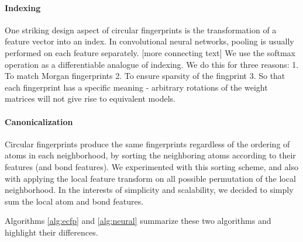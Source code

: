 \documentclass{article}
\begin{document}
\paragraph{Indexing}
One striking design aspect of circular fingerprints is the transformation of a feature vector into an index.
In convolutional neural networks, pooling is usually performed on each feature separately.
[more connecting text]
We use the softmax operation as a differentiable analogue of indexing.
We do this for three reasons: 1. To match Morgan fingerprints 2. To ensure sparsity of the fingprint 3. So that each fingerprint has a specific meaning - arbitrary rotations of the weight matrices will not give rise to equivalent models.

\paragraph{Canonicalization}
Circular fingerprints produce the same fingerprints regardless of the ordering of atoms in each neighborhood, by sorting the neighboring atoms according to their features (and bond features).
We experimented with this sorting scheme, and also with applying the local feature transform on all possible permutation of the local neighborhood.
In the interests of simplicity and scalability, we decided to simply sum the local atom and bond features.

Algorithms \ref{alg:ecfp} and \ref{alg:neural} summarize these two algorithms and highlight their differences.
\end{document}
